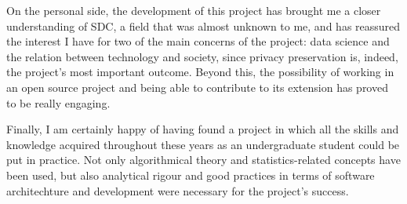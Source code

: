 On the personal side, the development of this project has brought me a closer understanding of SDC, a field that was almost unknown to me, and has reassured the interest I have for two of the main concerns of the project: data science and the relation between technology and society, since privacy preservation is, indeed, the project's most important outcome. Beyond this, the possibility of working in an open source project and being able to contribute to its extension has proved to be really engaging.

Finally, I am certainly happy of having found a project in which all the skills and knowledge acquired throughout these years as an undergraduate student could be put in practice. Not only algorithmical theory and statistics-related concepts have been used, but also analytical rigour and good practices in terms of software architechture and development were necessary for the project's success.